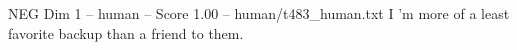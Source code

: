\begin{textsample}{NEG Dim 1 – human – Score 1.00 – human/t483\_human.txt}  \label{ex:f1_neg_005}
I ’m more of a least favorite backup than a friend to them.

\end{textsample}
